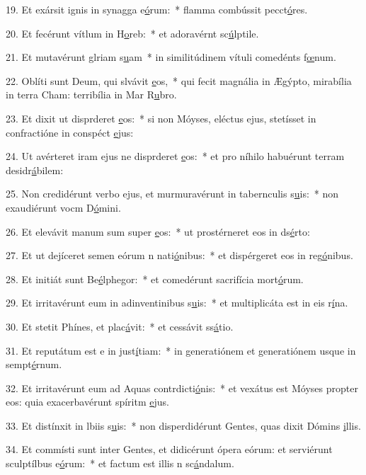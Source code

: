 19. Et exársit ignis in synagga e\uline{ó}rum:~* flamma combússit pecct\uline{ó}res.\par 
20. Et fecérunt vítlum in H\uline{o}reb:~* et adoravérnt sc\uline{ú}lptile.\par 
21. Et mutavérunt glriam s\uline{u}am~* in similitúdinem vítuli comedénts f\uline{œ}num.\par 
22. Oblíti sunt Deum, qui slvávit \uline{e}os,~* qui fecit magnália in Ægýpto, mirabília in terra Cham: terribília in Mar R\uline{u}bro.\par 
23. Et dixit ut disprderet \uline{e}os:~* si non Móyses, eléctus ejus, stetísset in confractióne in conspéct \uline{e}jus:\par 
24. Ut avérteret iram ejus ne disprderet \uline{e}os:~* et pro níhilo habuérunt terram desidr\uline{á}bilem:\par 
25. Non credidérunt verbo ejus, et murmuravérunt in tabernculis s\uline{u}is:~* non exaudiérunt vocm D\uline{ó}mini.\par 
26. Et elevávit manum sum super \uline{e}os:~* ut prostérneret eos in ds\uline{é}rto:\par 
27. Et ut dejíceret semen eórum n nati\uline{ó}nibus:~* et dispérgeret eos in reg\uline{ó}nibus.\par 
28. Et initiát sunt Be\uline{é}lphegor:~* et comedérunt sacrifícia mort\uline{ó}rum.\par 
29. Et irritavérunt eum in adinventinibus s\uline{u}is:~* et multiplicáta est in eis r\uline{í}na.\par 
30. Et stetit Phínes, et plac\uline{á}vit:~* et cessávit ss\uline{á}tio.\par 
31. Et reputátum est e in just\uline{í}tiam:~* in generatiónem et generatiónem usque in sempt\uline{é}rnum.\par 
32. Et irritavérunt eum ad Aquas contrdicti\uline{ó}nis:~* et vexátus est Móyses propter eos: quia exacerbavérunt spíritm \uline{e}jus.\par 
33. Et distínxit in lbiis s\uline{u}is:~* non disperdidérunt Gentes, quas dixit Dómins \uline{i}llis.\par 
34. Et commísti sunt inter Gentes, et didicérunt ópera eórum: et serviérunt sculptílbus e\uline{ó}rum:~* et factum est illis n sc\uline{á}ndalum.\par 
